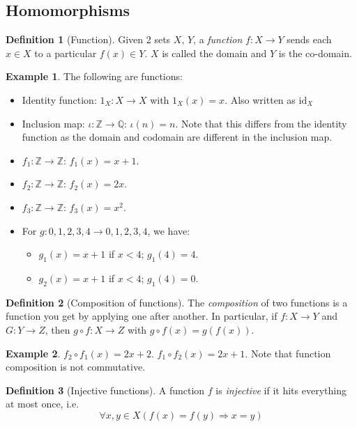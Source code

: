 \documentclass[a4paper]{article}
\theoremstyle{definition}
\newtheorem*{defi}{Definition}
\newtheorem*{eg}{Example}
\newcommand{\Z}{\mathbb{Z}}
\newcommand{\Q}{\mathbb{Q}}
\begin{document}
\subsection{Homomorphisms}
\begin{defi}[Function]
  Given 2 sets $X$, $Y$, a \emph{function} $f: X \rightarrow Y$ sends each $x\in X$ to a particular $f(x)\in Y$. $X$ is called the domain and $Y$ is the co-domain.
\end{defi}
\begin{eg}
  The following are functions:
  \begin{itemize}
  \item Identity function: $1_X: X \rightarrow X$  with $1_X(x) = x$. Also written as $\mathrm{id}_X$
  \item Inclusion map: $\iota: \Z \rightarrow \Q$: $\iota(n) = n$. Note that this differs from the identity function as the domain and codomain are different in the inclusion map.
  \item $f_1: \Z \rightarrow \Z$: $f_1(x) = x + 1$.
  \item $f_2: \Z \rightarrow \Z$: $f_2(x) = 2x$.
  \item $f_3: \Z \rightarrow \Z$: $f_3(x) = x^2$.
  \item For $g: {0, 1, 2, 3, 4} \rightarrow {0, 1, 2, 3, 4}$, we have:
    \begin{itemize}
    \item $g_1(x) = x + 1$ if $x < 4$; $g_1(4) = 4$.
    \item $g_2(x) = x + 1$ if $x < 4$; $g_1(4) = 0$.
    \end{itemize}
  \end{itemize}
\end{eg}

\begin{defi}[Composition of functions]
  The \emph{composition} of two functions is a function you get by applying one after another. In particular, if $f: X \rightarrow Y$ and $G: Y\rightarrow Z$, then $g\circ f: X \rightarrow Z$ with $g\circ f(x) = g(f(x))$.
\end{defi}
\begin{eg}
  $f_2\circ f_1(x) = 2x + 2$. $f_1\circ f_2 (x) = 2x + 1$. Note that function composition is not commutative.
\end{eg}
\begin{defi}[Injective functions]
  A function $f$ is \emph{injective} if it hits everything at most once, i.e.
  \[
  \forall x, y\in X(f(x) = f(y)\Rightarrow x = y)
  \]
\end{defi}
\end{document}
